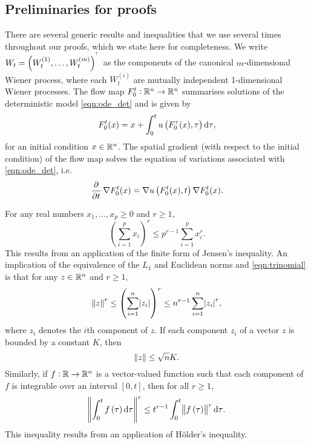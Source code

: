 \subsection{Preliminaries for proofs}\label{app:gauss}

There are several generic results and inequalities that we use several times throughout our proofs, which we state here for completeness.
We write \(W_t = \left(W_t^{(1)}, \hdots, W_t^{(m)}\right)^{^{\!\top}}\) as the components of the canonical \(m\)-dimensional Wiener process, where each \(W_t^{(i)}\) are mutually independent 1-dimensional Wiener processes.
The flow map \(F_0^t: \mathbb{R}^n \to \mathbb{R}^n\) summarises solutions of the deterministic model \cref{eqn:ode_det} and is given by
\begin{equation}
	F_{0}^{t}(x) = x + \int_{0}^{t}{u\left(F_{0}^{\tau}(x), \tau\right)\dif \tau},
	\label{eqn:flow_map_int}
\end{equation}
for an initial condition \(x \in \mathbb{R}^n\).
The spatial gradient (with respect to the initial condition) of the flow map solves the equation of variations associated with \cref{eqn:ode_det}, i.e.
\begin{equation}
	\dpd{}{t}\nabla F_0^t(x) = \nabla u\left(F_0^t(x), t\right)\nabla F_0^t(x).
	\label{eqn:eqn_of_vars}
\end{equation}

For any real numbers \(x_1,\hdots,x_p \geq 0\) and \(r \geq 1\),
\begin{equation}
	\left(\sum_{i=1}^p{x_i}\right)^r \leq p^{r-1}\sum_{i=1}^p{x_i^r}.
	\label{eqn:trinomial}
\end{equation}
This results from an application of the finite form of Jensen's inequality.
An implication of the equivalence of the \(L_1\) and Euclidean norms and \cref{eqn:trinomial} is that for any \(z \in \mathbb{R}^n\) and \(r \geq 1\),
\begin{equation}
	\norm{z}^r \leq \left(\sum_{i = 1}^n{\abs{z_i}}\right)^r \leq n^{r-1}\sum_{i=1}^n{\abs{z_i}^r},
	\label{eqn:norm_trinomial}
\end{equation}
where \(z_i\) denotes the \(i\)th component of \(z\).
If each component \(z_i\) of a vector \(z\) is bounded by a constant \(K\), then
\begin{equation}\label{eqn:bound_vector}
	\norm{z} \leq \sqrt{n} K.
\end{equation}
Similarly, if \(f: \mathbb{R} \to \mathbb{R}^n\) is a vector-valued function such that each component of \(f\) is integrable over an interval \([0,t]\), then for all \(r \geq 1\),
\begin{equation}
	\norm{\int_0^t{f\left(\tau\right)\dif\tau}}^r \leq t^{r-1}\int_0^t{\norm{f\left(\tau\right)}^r\dif\tau}.
	\label{eqn:convex_integral}
\end{equation}
This inequality results from an application of H\"{o}lder's inequality.


